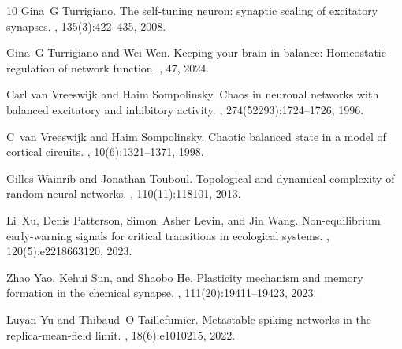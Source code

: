 \documentclass[onefignum,onetabnum]{siamart190516}
\newcommand{\1}{\mathbbm{1}}
\begin{document}
\begin{thebibliography}{10}
Gina~G Turrigiano.
\newblock The self-tuning neuron: synaptic scaling of excitatory synapses.
, 135(3):422--435, 2008.

Gina~G Turrigiano and Wei Wen.
\newblock Keeping your brain in balance: Homeostatic regulation of network
  function.
, 47, 2024.

Carl van Vreeswijk and Haim Sompolinsky.
\newblock Chaos in neuronal networks with balanced excitatory and inhibitory
  activity.
, 274(52293):1724--1726, 1996.

C~van Vreeswijk and Haim Sompolinsky.
\newblock Chaotic balanced state in a model of cortical circuits.
, 10(6):1321--1371, 1998.

Gilles Wainrib and Jonathan Touboul.
\newblock Topological and dynamical complexity of random neural networks.
, 110(11):118101, 2013.

Li~Xu, Denis Patterson, Simon~Asher Levin, and Jin Wang.
\newblock Non-equilibrium early-warning signals for critical transitions in
  ecological systems.
,
  120(5):e2218663120, 2023.

Zhao Yao, Kehui Sun, and Shaobo He.
\newblock Plasticity mechanism and memory formation in the chemical synapse.
, 111(20):19411--19423, 2023.

Luyan Yu and Thibaud~O Taillefumier.
\newblock Metastable spiking networks in the replica-mean-field limit.
, 18(6):e1010215, 2022.

\end{thebibliography}

	
\end{document}
